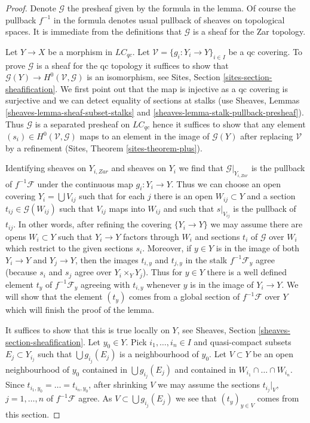 \begin{proof}
Denote $\mathcal{G}$ the presheaf given by the formula in the lemma.
Of course the pullback $f^{-1}$ in the formula denotes usual
pullback of sheaves on topological spaces. It is immediate
from the definitions that $\mathcal{G}$ is a sheaf for the Zar
topology.

\medskip\noindent
Let $Y \to X$ be a morphism in $\textit{LC}_{qc}$. Let
$\mathcal{V} = \{g_i : Y_i \to Y\}_{i \in I}$ be a qc covering.
To prove $\mathcal{G}$ is a sheaf for the qc topology it
suffices to show that
$\mathcal{G}(Y) \to H^0(\mathcal{V}, \mathcal{G})$
is an isomorphism, see Sites, Section \ref{sites-section-sheafification}.
We first point out that the map is injective as a qc covering
is surjective and we can detect equality of sections at stalks
(use Sheaves, Lemmas \ref{sheaves-lemma-sheaf-subset-stalks} and
\ref{sheaves-lemma-stalk-pullback-presheaf}). Thus
$\mathcal{G}$ is a separated presheaf on $\textit{LC}_{qc}$
hence it suffices to show that any element
$(s_i) \in H^0(\mathcal{V}, \mathcal{G})$
maps to an element in the image of $\mathcal{G}(Y)$
after replacing $\mathcal{V}$ by a refinement
(Sites, Theorem \ref{sites-theorem-plus}).

\medskip\noindent
Identifying sheaves on $Y_{i, Zar}$ and sheaves on $Y_i$ we find that
$\mathcal{G}|_{Y_{i, Zar}}$ is the pullback of $f^{-1}\mathcal{F}$ under
the continuous map $g_i : Y_i \to Y$. Thus we can choose an open covering
$Y_i = \bigcup V_{ij}$ such that for each $j$ there is an open
$W_{ij} \subset Y$ and a section $t_{ij} \in \mathcal{G}(W_{ij})$
such that $V_{ij}$ maps into $W_{ij}$ and such that
$s|_{V_{ij}}$ is the pullback of $t_{ij}$. In other words,
after refining the covering $\{Y_i \to Y\}$ we may assume there
are opens $W_i \subset Y$ such that $Y_i \to Y$ factors through $W_i$
and sections $t_i$ of $\mathcal{G}$ over $W_i$ which restrict
to the given sections $s_i$. Moreover, if $y \in Y$ is in the image
of both $Y_i \to Y$ and $Y_j \to Y$, then the images $t_{i, y}$
and $t_{j, y}$ in the stalk $f^{-1}\mathcal{F}_y$ agree
(because $s_i$ and $s_j$ agree over $Y_i \times_Y Y_j$).
Thus for $y \in Y$ there is a well defined element $t_y$ of
$f^{-1}\mathcal{F}_y$ agreeing with $t_{i, y}$ whenever $y$
is in the image of $Y_i \to Y$.
We will show that the element $(t_y)$ comes from a global section
of $f^{-1}\mathcal{F}$ over $Y$ which will finish the proof of the lemma.

\medskip\noindent
It suffices to show that this is true locally on $Y$, see
Sheaves, Section \ref{sheaves-section-sheafification}. Let $y_0 \in Y$.
Pick $i_1, \ldots, i_n \in I$ and
quasi-compact subsets $E_j \subset Y_{i_j}$ such that
$\bigcup g_{i_j}(E_j)$ is a neighbourhood of $y_0$.
Let $V \subset Y$ be an open neighbourhood of $y_0$ contained
in $\bigcup g_{i_j}(E_j)$ and contained in $W_{i_1} \cap \ldots \cap W_{i_n}$.
Since $t_{i_1, y_0} = \ldots = t_{i_n, y_0}$, after shrinking $V$
we may assume the sections $t_{i_j}|_V$, $j = 1, \ldots, n$ of
$f^{-1}\mathcal{F}$ agree. As $V \subset \bigcup g_{i_j}(E_j)$
we see that $(t_y)_{y \in V}$ comes from this section.


\end{proof}
